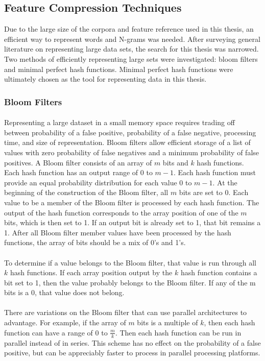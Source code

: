 	\subsection {Feature Compression Techniques} Due to the large size of the corpora and feature reference used in this thesis, an efficient way to represent words and N-grams was needed.  After surveying general literature on representing large data sets, the search for this thesis was narrowed.  Two methods of efficiently representing large sets were investigated: bloom filters and minimal perfect hash functions.  Minimal perfect hash functions were ultimately chosen as the tool for representing data in this thesis.

		\subsubsection{Bloom Filters}
			\paragraph{}Representing a large dataset in a small memory space requires trading off between probability of a false positive, probability of a false negative, processing time, and size of representation. Bloom filters allow efficient storage of a list of values with zero probability of false negatives and a minimum probability of false positives.  A Bloom filter consists of an array of $m$ bits and $k$ hash functions.  Each hash function has an output range of 0 to $m - 1$.  Each hash function must provide an equal probability distribution for each value 0 to $m-1$. At the beginning of the construction of the Bloom filter, all $m$ bits are set to 0. Each value to be a member of the Bloom filter is processed by each hash function.  The output of the hash function corresponds to the array position of one of the $m$ bits, which is then set to 1.  If an output bit is already set to 1, that bit remains a 1. After all Bloom filter member values have been processed by the hash functions, the array of bits should be a mix of 0's and 1's.  
			\paragraph{}To determine if a value belongs to the Bloom filter, that value is run through all $k$ hash functions.  If each array position output by the $k$ hash function contains a bit set to 1, then the value probably belongs to the Bloom filter.  If any of the m bits is a 0, that value does not belong.
			\paragraph{} There are variations on the Bloom filter that can use parallel architectures to advantage.  For example, if the array of $m$ bits is a multiple of $k$, then each hash function can have a range of 0 to $\frac{m}{k}$.  Then each hash function can be run in parallel instead of in series.  This scheme has no effect on the probability of a false positive, but can be appreciably faster to process in parallel processing platforms.
